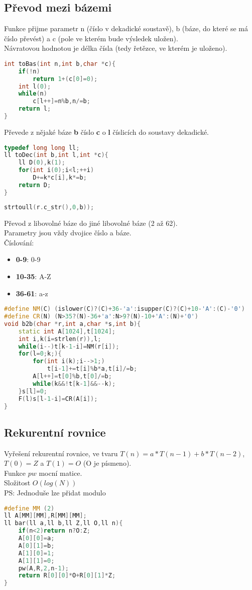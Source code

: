 \documentclass[11pt]{article}
\begin{document}
\subsection{Převod mezi bázemi}
Funkce přijme parametr \textsf{n} (číslo v dekadické soustavě), \textsf{b} (báze, do které se má číslo převést) a \textsf{c} (pole ve kterém bude výsledek uložen).
\\Návratovou hodnotou je délka čísla (tedy řetězce, ve kterém je uloženo).
\begin{lstlisting}[language=C++]
int toBas(int n,int b,char *c){
    if(!n)
        return 1+(c[0]=0);
    int l(0);
    while(n)
        c[l++]=n%b,n/=b;
    return l;
}
\end{lstlisting}
Převede z nějaké báze \textbf{b} číslo \textbf{c} o \textbf{l} číslicích do soustavy dekadické. 
\begin{lstlisting}[language=C++]
typedef long long ll;
ll toDec(int b,int l,int *c){
    ll D(0),k(1);
    for(int i(0);i<l;++i)
        D+=k*c[i],k*=b;
    return D;
}
\end{lstlisting}
\begin{lstlisting}[language=C++]
strtoull(r.c_str(),0,b));
\end{lstlisting}
Převod z libovolné báze do jiné libovolné báze (2 až 62).
\\Parametry jsou vždy dvojice číslo a báze.
\\Číslování:
\begin{itemize}
\item \textbf{0-9}: 0-9
\item \textbf{10-35}: A-Z
\item \textbf{36-61}: a-z
\end{itemize}
\begin{lstlisting}[language=C++]
#define NM(C) (islower(C)?(C)+36-'a':isupper(C)?(C)+10-'A':(C)-'0')
#define CR(N) (N>35?(N)-36+'a':N>9?(N)-10+'A':(N)+'0')
void b2b(char *r,int a,char *s,int b){
    static int A[1024],t[1024];
    int i,k(i=strlen(r)),l;
    while(i--)t[k-1-i]=NM(r[i]);
    for(l=0;k;){
        for(int i(k);i-->1;)
            t[i-1]+=t[i]%b*a,t[i]/=b;
        A[l++]=t[0]%b,t[0]/=b;
        while(k&&!t[k-1]&&--k);
    }s[l]=0;
    F(l)s[l-1-i]=CR(A[i]);
}
\end{lstlisting}
\subsection{Rekurentní rovnice}
Vyřešení rekurentní rovnice, ve tvaru $T(n)=a*T(n-1)+b*T(n-2)$, $T(0)=Z$ a $T(1)=O$ (O je písmeno).
\\Funkce $pw$ mocní matice.
\\Složitost $O(log(N))$
\\PS: Jednoduše lze přidat modulo
\begin{lstlisting}[language=C++]
#define MM (2)
ll A[MM][MM],R[MM][MM];
ll bar(ll a,ll b,ll Z,ll O,ll n){
    if(n<2)return n?O:Z;
    A[0][0]=a;
    A[0][1]=b;
    A[1][0]=1;
    A[1][1]=0;
    pw(A,R,2,n-1);
    return R[0][0]*O+R[0][1]*Z;
}
\end{lstlisting}
\end{document}
